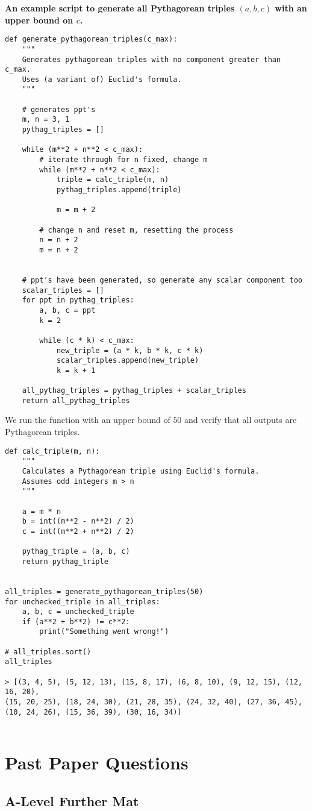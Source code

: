 \documentclass[12pt]{article}
\begin{document}
\pagebreak 
\noindent \textbf{An example script to generate all Pythagorean triples $(a, b, c)$ with an upper bound on $c$.}

\begin{verbatim}
def generate_pythagorean_triples(c_max):
    """
    Generates pythagorean triples with no component greater than c_max.
    Uses (a variant of) Euclid's formula.
    """

    # generates ppt's
    m, n = 3, 1
    pythag_triples = []

    while (m**2 + n**2 < c_max):
        # iterate through for n fixed, change m
        while (m**2 + n**2 < c_max):
            triple = calc_triple(m, n)
            pythag_triples.append(triple)

            m = m + 2

        # change n and reset m, resetting the process
        n = n + 2
        m = n + 2 


    # ppt's have been generated, so generate any scalar component too
    scalar_triples = []
    for ppt in pythag_triples:
        a, b, c = ppt
        k = 2

        while (c * k) < c_max:
            new_triple = (a * k, b * k, c * k)
            scalar_triples.append(new_triple)
            k = k + 1
            
    all_pythag_triples = pythag_triples + scalar_triples
    return all_pythag_triples
\end{verbatim}
We run the function with an upper bound of $50$ and verify that all outputs are Pythagorean triples.
\begin{verbatim}
def calc_triple(m, n):
    """
    Calculates a Pythagorean triple using Euclid's formula.
    Assumes odd integers m > n
    """
    
    a = m * n
    b = int((m**2 - n**2) / 2)
    c = int((m**2 + n**2) / 2)

    pythag_triple = (a, b, c)
    return pythag_triple


all_triples = generate_pythagorean_triples(50)
for unchecked_triple in all_triples:
    a, b, c = unchecked_triple
    if (a**2 + b**2) != c**2:
        print("Something went wrong!")

# all_triples.sort()
all_triples

> [(3, 4, 5), (5, 12, 13), (15, 8, 17), (6, 8, 10), (9, 12, 15), (12, 16, 20),
(15, 20, 25), (18, 24, 30), (21, 28, 35), (24, 32, 40), (27, 36, 45), 
(10, 24, 26), (15, 36, 39), (30, 16, 34)]


\end{verbatim}

\section{Past Paper Questions}

\subsection{A-Level Further Mat}
\end{document}

